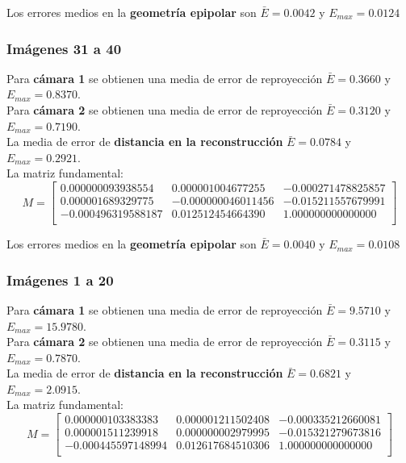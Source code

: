 \documentclass[a4paper, fontsize=11pt]{scrartcl} %
\numberwithin{equation}{section} %
\numberwithin{figure}{section} %
\numberwithin{table}{section} %
\begin{document}
	Los errores medios en la \textbf{geometría epipolar} son $\bar{E} = 0.0042$ y $E_{max} = 0.0124$
	
	\subsubsection*{Imágenes 31 a 40}
	
	Para \textbf{cámara 1} se obtienen una media de error de reproyección $\bar{E} = 0.3660$ y $E_{max} = 0.8370$.\\
	Para \textbf{cámara 2} se obtienen una media de error de reproyección $\bar{E} = 0.3120$ y $E_{max} = 0.7190$.\\
	
	La media de error de \textbf{distancia en la reconstrucción} $\bar{E} = 0.0784$ y $E_{max} = 0.2921$.\\
	La matriz fundamental:
	\[
	M=
	\begin{bmatrix}
	0.000000093938554&	0.000001004677255&	-0.000271478825857 \\
	0.000001689329775&	-0.000000046011456&	-0.015211557679991 \\
	-0.000496319588187&	0.012512454664390&	1.000000000000000 \\
	
	\end{bmatrix}
	\]
	
	Los errores medios en la \textbf{geometría epipolar} son $\bar{E} = 0.0040$ y $E_{max} = 0.0108$
	
	\subsubsection*{Imágenes 1 a 20}
	
	Para \textbf{cámara 1} se obtienen una media de error de reproyección $\bar{E} = 9.5710$ y $E_{max} = 15.9780$.\\
	Para \textbf{cámara 2} se obtienen una media de error de reproyección $\bar{E} = 0.3115$ y $E_{max} = 0.7870$.\\
	
	La media de error de \textbf{distancia en la reconstrucción} $\bar{E} = 0.6821$ y $E_{max} = 2.0915$.\\
	La matriz fundamental:
	\[
	M=
	\begin{bmatrix}
	0.000000103383383&	0.000001211502408&	-0.000335212660081 \\
	0.000001511239918&	0.000000002979995&	-0.015321279673816 \\
	-0.000445597148994&	0.012617684510306&	1.000000000000000  \\
	
	\end{bmatrix}
	\]
	
\end{document}
